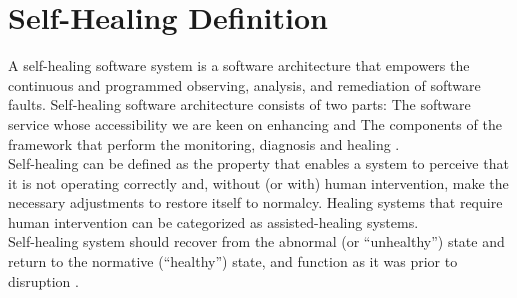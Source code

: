 \chapter{Self-Healing Definition} \label{ch:selfHelingDefinition}

A self-healing software system is a software architecture that empowers the continuous and programmed observing, analysis, and remediation of software faults. Self-healing software architecture consists of two parts: The software service whose accessibility we are keen on enhancing and The components of the framework that perform the monitoring, diagnosis and healing \cite{Keromytis:SelfHealingSurvey:2011}.\\

Self-healing can be defined as the property that enables a system to perceive that it is not
operating correctly and, without (or with) human intervention, make the necessary adjustments to restore itself to normalcy. Healing systems that require human intervention can be categorized as assisted-healing systems\cite{Ghosh:SelfHealingSurvey:2007}.\\

Self-healing system should recover from the abnormal (or “unhealthy”) state and return to the normative (“healthy”) state, and function as it was prior to disruption \cite{Harald:SelfHealingSurvey:2011}.\\
